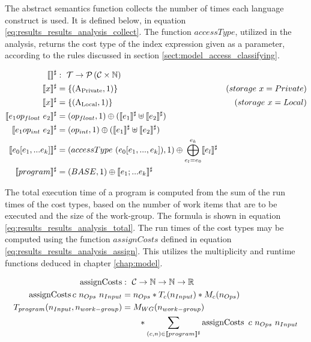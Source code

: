 The abstract semantics function collects the number of times each language construct is used. It is defined below, in equation \ref{eq:results_results_analysis_collect}. The function $accessType$, utilized in the analysis, returns the cost type of the index expression given as a parameter, according to the rules discussed in section \ref{sect:model_access_classifying}.

\begin{align}
        \label{eq:results_results_analysis_collect}
	\llbracket  \rrbracket^\sharp &:\ \mathcal{T} \rightarrow \mathcal{P}\left(\mathcal{C} \times \mathbb{N}\right)\\
	\llbracket x \rrbracket^\sharp &= \left\{ (\operatorname{A_{Private}}, 1) \right\}   & (storage\ x = Private) \notag\\
    \llbracket x \rrbracket^\sharp &= \left\{ (\operatorname{A_{Local}}, 1) \right\}   & (storage\ x = Local) \notag\\
    \llbracket e_1 op_{float}\ e_2 \rrbracket^\sharp &= (op_{float}, 1) \oplus (\llbracket e_1 \rrbracket^\sharp \uplus \llbracket e_2 \rrbracket^\sharp) \notag\\
    \llbracket e_1 op_{int}\ e_2 \rrbracket^\sharp &= (op_{int}, 1) \oplus (\llbracket e_1 \rrbracket^\sharp \uplus \llbracket e_2 \rrbracket^\sharp) \notag\\
    \llbracket e_0[e_1,...e_k] \rrbracket^\sharp &= (accessType\ (e_0[e_1,...,e_k]), 1) \oplus \bigoplus_{e_l = e_0}^{e_k}\llbracket e_l \rrbracket^\sharp \notag\\
    \llbracket program \rrbracket^\sharp &= (BASE, 1) \oplus \llbracket e_1;...e_k \rrbracket^\sharp \notag
\end{align}

The total execution time of a program is computed from the sum of the run times of the cost types, based on the number of work items that are to be executed and the size of the work-group. The formula is shown in equation \ref{eq:results_results_analysis_total}. The run times of the cost types may be computed using the function $assignCosts$ defined in equation \ref{eq:results_results_analysis_assign}. This utilizes the multiplicity and runtime functions deduced in chapter \ref{chap:model}.

\begin{align}
    \label{eq:results_results_analysis_assign}
    \operatorname{assignCosts} &:\ \mathcal{C} \rightarrow \mathbb{N} \rightarrow \mathbb{N} \rightarrow \mathbb{R}\\
    \operatorname{assignCosts} c\ n_{Ops}\ n_{Input} &= n_{Ops} * T_{c}(n_{Input}) * M_{c}(n_{Ops})\notag\\
    \label{eq:results_results_analysis_total}
    T_{program}(n_{Input}, n_{work-group}) &= M_{WG}(n_{work-group}) \\
    &\qquad        *  \sum_{(c,n) \in \llbracket program \rrbracket^\sharp} \operatorname{assignCosts}\ c\ n_{Ops}\ n_{Input}\notag
\end{align}

